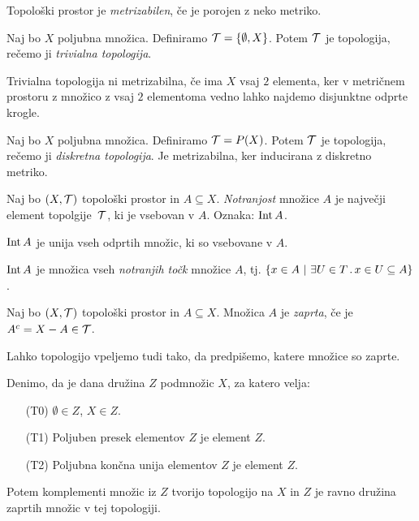 \begin{definicija}
    Topološki prostor je \emph{metrizabilen}, če je porojen z neko metriko.
\end{definicija}

\begin{primer}
    Naj bo $X$ poljubna množica. Definiramo $\mathcal{T} = \left\{\emptyset, X\right\}$. Potem $\mathcal{T}$ je topologija, rečemo ji \emph{trivialna topologija}.

    Trivialna topologija ni metrizabilna, če ima $X$ vsaj $2$ elementa, ker v metričnem prostoru z množico z vsaj $2$ elementoma vedno lahko najdemo disjunktne odprte krogle.
\end{primer}

\begin{primer}
    Naj bo $X$ poljubna množica. Definiramo $\mathcal{T} = P(X)$. Potem $\mathcal{T}$ je topologija, rečemo ji \emph{diskretna topologija}.
    Je metrizabilna, ker inducirana z diskretno metriko.
\end{primer}

\begin{definicija}
    Naj bo $(X, \mathcal{T})$ topološki prostor in $A \subseteq X$. \emph{Notranjost} množice $A$ je največji element topolgije~$\mathcal{T}$, ki je vsebovan v $A$. Oznaka: $\operatorname{Int} A$.
\end{definicija}

\begin{trditev}
    $\operatorname{Int} A$ je unija vseh odprtih množic, ki so vsebovane v $A$.
\end{trditev}

\begin{trditev}
    $\operatorname{Int} A$ je množica vseh \emph{notranjih točk} množice $A$, tj. $\left\{x \in A \ | \ \exists U \in T \,.\, x \in U \subseteq A\right\}$.
\end{trditev}

\begin{definicija}
    Naj bo $(X, \mathcal{T})$ topološki prostor in $A \subseteq X$. Množica $A$ je \emph{zaprta}, če je $A^c = X - A \in \mathcal{T}$.
\end{definicija}

\begin{opomba}
    Lahko topologijo vpeljemo tudi tako, da predpišemo, katere množice so zaprte.

    Denimo, da je dana družina $Z$ podmnožic $X$, za katero velja:
    \begin{enumerate}
        \item[(T0)] $\emptyset \in Z$, $X \in Z$.
        \item[(T1)] Poljuben presek elementov $Z$ je element $Z$.
        \item[(T2)] Poljubna končna unija elementov $Z$ je element $Z$.
    \end{enumerate}
    Potem komplementi množic iz $Z$ tvorijo topologijo na $X$ in $Z$ je ravno družina zaprtih množic v tej topologiji.
\end{opomba}

